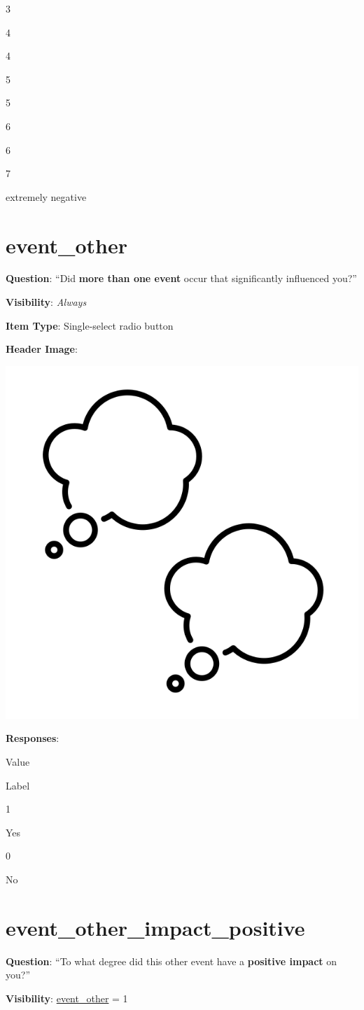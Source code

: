 \documentclass[]{book}
\begin{document}
3

4

4

5

5

6

6

7

extremely negative

\hypertarget{event_other}{%
\section{event\_other}\label{event_other}}

\textbf{Question}: ``Did \textbf{more than one event} occur that significantly influenced you?''

\textbf{Visibility}: \emph{Always}

\textbf{Item Type}: Single-select radio button

\textbf{Header Image}:

\begin{flushleft}\includegraphics[width=0.33\linewidth]{downloadFigs4latex_NIMH_Applet_Codebook/event_other_headerImg} \end{flushleft}

\textbf{Responses}:

Value

Label

1

Yes

0

No

\hypertarget{event_other_impact_positive}{%
\section{event\_other\_impact\_positive}\label{event_other_impact_positive}}

\textbf{Question}: ``To what degree did this other event have a \textbf{positive impact} on you?''

\textbf{Visibility}: \protect\hyperlink{event_other}{event\_other} = 1
\end{document}
